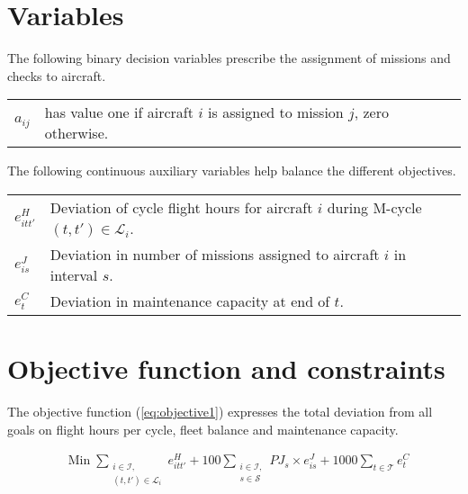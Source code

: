 \section{Variables}

    The following binary decision variables prescribe the assignment of missions and checks to aircraft.

    \begin{tabular}{p{8mm}p{127mm}}
      $a_{ij}$ & has value one if aircraft $i$ is assigned to mission $j$, zero otherwise.
    \end{tabular}

    The following continuous auxiliary variables help balance the different objectives.

    \begin{tabular}{p{8mm}p{127mm}}
      $e^{H}_{itt'}$  & Deviation of cycle flight hours for aircraft $i$ during M-cycle $(t, t') \in \mathcal{L}_i$. \\
      $e^{J}_{is}$ & Deviation in number of missions assigned to aircraft $i$ in interval $s$. \\
      $e^{C}_{t}$ & Deviation in maintenance capacity at end of $t$. \\
    \end{tabular}

\section{Objective function and constraints}
    
  The objective function (\ref{eq:objective1}) expresses the total deviation from all goals on flight hours per cycle, fleet balance and maintenance capacity.

  \begin{align}
    & \text{Min}\; 
    \sum_{\substack{
            i \in \mathcal{I}, \\ (t, t') \in \mathcal{L}_i
            }
        } e^{H}_{itt'}
    + 100 \sum_{\substack{
            i \in \mathcal{I}, \\ s \in \mathcal{S}
            } 
        } PJ_s \times e^{J}_{is}
    + 1000 \sum_{t \in \mathcal{T}} 
    e^{C}_{t} 
    \label{eq:objective1}
  \end{align}

